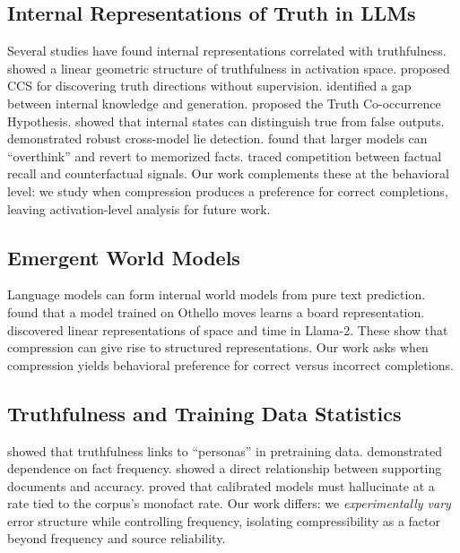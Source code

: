 \documentclass[10pt]{article} %
\begin{document}
\subsection{Internal Representations of Truth in LLMs}

Several studies have found internal representations correlated with truthfulness. \citet{marks2023geometry} showed a linear geometric structure of truthfulness in activation space. \citet{burns2023discovering} proposed CCS for discovering truth directions without supervision. \citet{li2023b_inference} identified a gap between internal knowledge and generation. \citet{ravfogel2025emergence} proposed the Truth Co-occurrence Hypothesis. \citet{azaria2023internal} showed that internal states can distinguish true from false outputs. \citet{burger2024truth} demonstrated robust cross-model lie detection. \citet{halawi2024overthinking} found that larger models can ``overthink'' and revert to memorized facts. \citet{ortu2024competition} traced competition between factual recall and counterfactual signals. Our work complements these at the behavioral level: we study when compression produces a preference for correct completions, leaving activation-level analysis for future work.

\subsection{Emergent World Models}

Language models can form internal world models from pure text prediction. \citet{li2023a_emergent} found that a model trained on Othello moves learns a board representation. \citet{gurnee2024language} discovered linear representations of space and time in Llama-2. These show that compression can give rise to structured representations. Our work asks when compression yields behavioral preference for correct versus incorrect completions.

\subsection{Truthfulness and Training Data Statistics}

\citet{joshi2024personas} showed that truthfulness links to ``personas'' in pretraining data. \citet{elazar2022measuring} demonstrated dependence on fact frequency. \citet{kandpal2023large} showed a direct relationship between supporting documents and accuracy. \citet{kalai2024calibrated} proved that calibrated models must hallucinate at a rate tied to the corpus's monofact rate. Our work differs: we \textit{experimentally vary} error structure while controlling frequency, isolating compressibility as a factor beyond frequency and source reliability.
\end{document}
